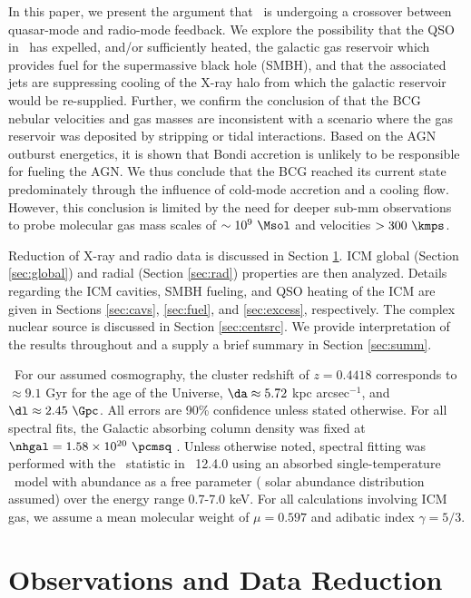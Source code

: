 \documentclass[useAMS,usenatbib]{mn2e}
\begin{document}
In this paper, we present the argument that \irs\ is undergoing a
crossover between quasar-mode and radio-mode feedback. We explore the
possibility that the QSO in \irs\ has expelled, and/or sufficiently
heated, the galactic gas reservoir which provides fuel for the
supermassive black hole (SMBH), and that the associated jets are
suppressing cooling of the X-ray halo from which the galactic
reservoir would be re-supplied. Further, we confirm the conclusion of
\citet{1996MNRAS.283.1003C} that the BCG nebular velocities and gas
masses are inconsistent with a scenario where the gas reservoir was
deposited by stripping or tidal interactions. Based on the AGN
outburst energetics, it is shown that Bondi accretion is unlikely to
be responsible for fueling the AGN. We thus conclude that the BCG
reached its current state predominately through the influence of
cold-mode accretion and a cooling flow. However, this conclusion is
limited by the need for deeper sub-mm observations to probe molecular
gas mass scales of $\sim 10^9 ~\Msol$ and velocities $> 300 ~\kmps$.

Reduction of X-ray and radio data is discussed in Section
\ref{sec:obs}. ICM global (Section \ref{sec:global}) and radial
(Section \ref{sec:rad}) properties are then analyzed. Details
regarding the ICM cavities, SMBH fueling, and QSO heating of the ICM
are given in Sections \ref{sec:cavs}, \ref{sec:fuel}, and
\ref{sec:excess}, respectively. The complex nuclear source is
discussed in Section \ref{sec:centsrc}. We provide interpretation of
the results throughout and a supply a brief summary in Section
\ref{sec:summ}.

\LCDM\ For our assumed cosmography, the cluster redshift of $z =
0.4418$ corresponds to $\approx 9.1$ Gyr for the age of the Universe,
$\da \approx 5.72$ kpc arcsec$^{-1}$, and $\dl \approx 2.45~\Gpc$. All
errors are 90\% confidence unless stated otherwise. For all spectral
fits, the Galactic absorbing column density was fixed at $\nhgal =
1.58 \times 10^{20} ~\pcmsq$ \citep{lab}. Unless otherwise noted,
spectral fitting was performed with the \chisq\ statistic in
\xspec\ 12.4.0 \citep{xspec} using an absorbed single-temperature
\mekal\ model \citep{mekal1, mekal2} with abundance as a free
parameter (\citealt{ag89} solar abundance distribution assumed) over
the energy range 0.7-7.0 keV.  For all calculations involving ICM gas,
we assume a mean molecular weight of $\mu = 0.597$ and adibatic index
$\gamma = 5/3$.

\section{Observations and Data Reduction}
\label{sec:obs}
\end{document}
